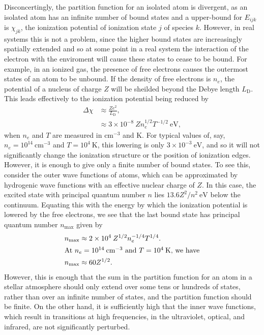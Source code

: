 Disconcertingly, the partition function for an isolated atom is
divergent, as an isolated atom has an infinite number of bound states and
a upper-bound for $E_{ijk}$ is $\chi_{jk}$, the ionization potential of
ionization state $j$ of species $k$. However, in real systems this is
not a problem, since the higher bound states are increasingly spatially
extended and so at some point in a real system the interaction of the
electron with the enviroment will cause these states to cease to be
bound. For example, in an ionized gas, the presence of free electrons
causes the outermost states of an atom to be unbound. If the density of
free electrons is $n_e$, the potential of a nucleus of charge $Z$ will
be sheilded beyond the Debye length $L_\mathrm{D}$. This leads
effectively to the ionization potential being reduced by
\begin{align}
\Delta\chi &\approx \frac{Ze^2}{L_\mathrm{D}},\\
&\approx
3 \times 10^{-8}\:
Z n_e^{1/2}
T^{-1/2}~\mathrm{eV},
\end{align}
when $n_e$ and $T$ are measured in $\mathrm{cm^{-3}}$ and K. For typical
values of, say, $n_e = 10^{14}\:\mathrm{cm^{-3}}$ and $T =
10^4\:\mathrm{K}$, this lowering is only $3 \times 10^{-3}~\mathrm{eV}$,
and so it will not significantly change the ionization structure or the
position of ionization edges. However, it is enough to give only a
finite number of bound states. To see this, consider the outer wave
functions of atoms, which can be approximated by hydrogenic wave
functions with an effective nuclear charge of $Z$. In this case, the
excited state with principal quantum number $n$ lies
$13.6Z^2/n^2~\mathrm{eV}$ below the continuum. Equating this with the
energy by which the ionization potential is lowered by the free
electrons, we see that the last bound state has principal quantum number
$n_\mathrm{max}$ given by
\begin{align}
n_\mathrm{max} &\approx 2 \times 10^4\: Z^{1/2}n_e^{-1/4}T^{1/4}.\\
\intertext{At $n_e = 10^{14}\:\mathrm{cm^{-3}}$ and $T = 10^4\:\mathrm{K}$, we have}
n_\mathrm{max} &\approx 60 Z^{1/2}.
\end{align}
However, this is enough that the sum in the partition function for an
atom in a stellar atmosphere should only extend over some tens or
hundreds of states, rather than over an infinite number of states, and
the partition function should be finite. On the other hand, it is
sufficiently high that the inner wave functions, which result in
transitions at high frequencies, in the ultraviolet, optical, and
infrared, are not significantly perturbed.

